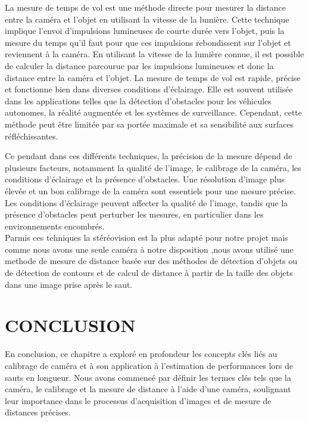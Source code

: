 \begin{itemize}[label={\Huge$\star$}]
 	La mesure de temps de vol est une méthode directe pour mesurer la distance entre la caméra et l'objet en utilisant la vitesse de la lumière. Cette technique implique l'envoi d'impulsions lumineuses de courte durée vers l'objet, puis la mesure du temps qu'il faut pour que ces impulsions rebondissent sur l'objet et reviennent à la caméra. En utilisant la vitesse de la lumière connue, il est possible de calculer la distance parcourue par les impulsions lumineuses et donc la distance entre la caméra et l'objet. La mesure de temps de vol est rapide, précise et fonctionne bien dans diverses conditions d'éclairage. Elle est souvent utilisée dans les applications telles que la détection d'obstacles pour les véhicules autonomes, la réalité augmentée et les systèmes de surveillance. Cependant, cette méthode peut être limitée par sa portée maximale et sa sensibilité aux surfaces réfléchissantes.

 \end{itemize}

Ce pendant dans ces différents techniques, la précision de la mesure dépend de plusieurs facteurs, notamment la qualité de l'image, le calibrage de la caméra, les conditions d'éclairage et la présence d'obstacles. Une résolution d'image plus élevée et un bon calibrage de la caméra sont essentiels pour une mesure précise. Les conditions d'éclairage peuvent affecter la qualité de l'image, tandis que la présence d'obstacles peut perturber les mesures, en particulier dans les environnements encombrés.\\

Parmis ces tehniques la stéréovision est la plus adapté pour notre projet mais comme nous avons une seule caméra à notre disposition ,nous avons utilisé une methode de mesure de distance basée sur des méthodes de détection d'objets ou de détection de contours et de calcul de distance à partir de la taille des objets dans une image prise après le saut.


\newpage
\section{CONCLUSION}

En conclusion, ce chapitre a exploré en profondeur les concepts clés liés au calibrage de caméra et à son application à l'estimation de performances lors de sauts en longueur. Nous avons commencé par définir les termes clés tels que la caméra, le calibrage et la mesure de distance à l'aide d'une caméra, soulignant leur importance dans le processus d'acquisition d'images et de mesure de distances précises.

